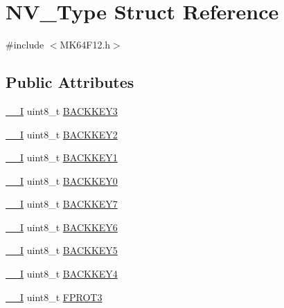 \hypertarget{structNV__Type}{}\section{N\+V\+\_\+\+Type Struct Reference}
\label{structNV__Type}


{\ttfamily \#include $<$M\+K64\+F12.\+h$>$}

\subsection*{Public Attributes}
\begin{DoxyCompactItemize}
\item 
\hyperlink{core__sc300_8h_af63697ed9952cc71e1225efe205f6cd3}{\+\_\+\+\_\+I} uint8\+\_\+t \hyperlink{structNV__Type_a99c28a1d24b507ca392b62abd7326c22}{B\+A\+C\+K\+K\+E\+Y3}
\item 
\hyperlink{core__sc300_8h_af63697ed9952cc71e1225efe205f6cd3}{\+\_\+\+\_\+I} uint8\+\_\+t \hyperlink{structNV__Type_ab01f94708b68f34fd5b40a18b21c6d76}{B\+A\+C\+K\+K\+E\+Y2}
\item 
\hyperlink{core__sc300_8h_af63697ed9952cc71e1225efe205f6cd3}{\+\_\+\+\_\+I} uint8\+\_\+t \hyperlink{structNV__Type_ad90570e3331407893b892cd722c8566c}{B\+A\+C\+K\+K\+E\+Y1}
\item 
\hyperlink{core__sc300_8h_af63697ed9952cc71e1225efe205f6cd3}{\+\_\+\+\_\+I} uint8\+\_\+t \hyperlink{structNV__Type_a84e62b140feac9fcae8b251607c814e7}{B\+A\+C\+K\+K\+E\+Y0}
\item 
\hyperlink{core__sc300_8h_af63697ed9952cc71e1225efe205f6cd3}{\+\_\+\+\_\+I} uint8\+\_\+t \hyperlink{structNV__Type_ade5b560a7ad515e084070fde57ea32d7}{B\+A\+C\+K\+K\+E\+Y7}
\item 
\hyperlink{core__sc300_8h_af63697ed9952cc71e1225efe205f6cd3}{\+\_\+\+\_\+I} uint8\+\_\+t \hyperlink{structNV__Type_a39aa00a01f54dd8348854da97790e930}{B\+A\+C\+K\+K\+E\+Y6}
\item 
\hyperlink{core__sc300_8h_af63697ed9952cc71e1225efe205f6cd3}{\+\_\+\+\_\+I} uint8\+\_\+t \hyperlink{structNV__Type_ae2121000a273d32aeeaf2f4100ea3471}{B\+A\+C\+K\+K\+E\+Y5}
\item 
\hyperlink{core__sc300_8h_af63697ed9952cc71e1225efe205f6cd3}{\+\_\+\+\_\+I} uint8\+\_\+t \hyperlink{structNV__Type_a0bc51ff64f2fe752028b0cf769f95f66}{B\+A\+C\+K\+K\+E\+Y4}
\item 
\hyperlink{core__sc300_8h_af63697ed9952cc71e1225efe205f6cd3}{\+\_\+\+\_\+I} uint8\+\_\+t \hyperlink{structNV__Type_a681eb6e0560291b4c2e83e4e85923347}{F\+P\+R\+O\+T3}

\end{DoxyCompactItemize}
